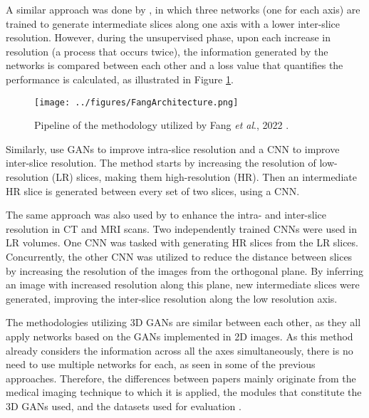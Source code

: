 A similar approach was done by \textcite{Fang2022}, in which three networks (one for each axis) are trained to generate intermediate slices along one axis with a lower inter-slice resolution. However, during the unsupervised phase, upon each increase in resolution (a process that occurs twice), the information generated by the networks is compared between each other and a loss value that quantifies the performance is calculated, as illustrated in Figure \ref{fig:FangArchitecture}.
\begin{figure}[!ht]
	\hspace*{-0.7in}
	\texttt{[image: ../figures/FangArchitecture.png]}
	\caption{Pipeline of the methodology utilized by Fang \textit{et al}., 2022 \cite{Fang2022}.}
	\label{fig:FangArchitecture}
\end{figure}
\par
Similarly, \textcite{Nimitha2024} use GANs to improve intra-slice resolution and a CNN to improve inter-slice resolution. The method starts by increasing the resolution of low-resolution (LR) slices, making them high-resolution (HR). Then an intermediate HR slice is generated between every set of two slices, using a CNN.
\par
The same approach was also used by \textcite{Georgescu2020} to enhance the intra- and inter-slice resolution in CT and MRI scans. Two independently trained CNNs were used in LR volumes. One CNN was tasked with generating HR slices from the LR slices. Concurrently, the other CNN was utilized to reduce the distance between slices by increasing the resolution of the images from the orthogonal plane. By inferring an image with increased resolution along this plane, new intermediate slices were generated, improving the inter-slice resolution along the low resolution axis.
\par
The methodologies utilizing 3D GANs are similar between each other, as they all apply networks based on the GANs implemented in 2D images. As this method already considers the information across all the axes simultaneously, there is no need to use multiple networks for each, as seen in some of the previous approaches. Therefore, the differences between papers mainly originate from the medical imaging technique to which it is applied, the modules that constitute the 3D GANs used, and the datasets used for evaluation \parencite{YChen2018, Sanchez2018, Kudo2019, Zhang2022}.

